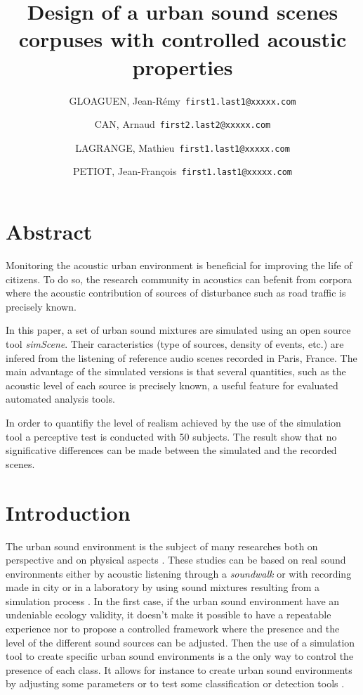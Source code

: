 \documentclass[a4,11pt,twocolumn]{article}
\title{Design of a urban sound scenes corpuses with controlled acoustic properties}     %
\author{
  GLOAGUEN, Jean-R\'emy\      \texttt{first1.last1@xxxxx.com}
  \and
  CAN, Arnaud\      \texttt{first2.last2@xxxxx.com}
  \and
  LAGRANGE, Mathieu\      \texttt{first1.last1@xxxxx.com}
  \and
  PETIOT, Jean-Fran\c cois\      \texttt{first1.last1@xxxxx.com}
}
\begin{document}
\maketitle

\section*{Abstract}

Monitoring the acoustic urban environment is beneficial for improving the life of citizens. To do so, the research community in acoustics can befenit from corpora where the acoustic contribution of sources of disturbance such as road traffic is precisely known.

In this paper, a set of urban sound mixtures are simulated using an open source tool \textit{simScene}. Their caracteristics (type of sources, density of events, etc.) are infered from the listening of reference audio scenes recorded in Paris, France. The main advantage of the simulated versions is that several quantities, such as the acoustic level of each source is precisely known, a useful feature for evaluated automated analysis tools.

In order to quantifiy the level of realism achieved by the use of the simulation tool a perceptive test is conducted with 50 subjects. The result show that no significative differences can be made between the simulated and the recorded scenes.

\section*{Introduction}

The urban sound environment is the subject of many researches both on perspective \cite{jin_yong_soundwalk_2013} \cite{botteldooren_understanding_2011} and on physical aspects \cite{can_describing_2015} \cite{raimbault_ambient_2003}. These studies can be based on real sound environments either by acoustic listening through a \textit{soundwalk} \cite{adams_soundwalking_2008} or with recording made in city \cite{botteldooren_temporal_2006} or in a laboratory by using sound mixtures resulting from a simulation process \cite{lafay_new_2014}. In the first case, if the urban sound environment have an undeniable ecology validity, it doesn't make it possible to have a repeatable experience nor to propose a controlled framework where the presence and the level of the different sound sources can be adjusted. Then the use of a simulation tool to create specific urban sound environments is a the only way to control the presence of each class. It allows for instance to create urban sound environments by adjusting some parameters \cite{bruce_development_2009} or to test some classification or detection tools \cite{giannoulis_detection_2013} .
\end{document}
